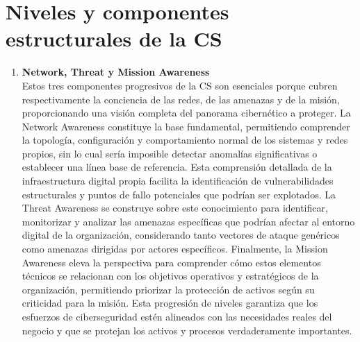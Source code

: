 \section{Niveles y componentes estructurales de la CS}
\begin{enumerate}
\item \textbf{Network, Threat y Mission Awareness} \\
Estos tres componentes progresivos de la CS son esenciales porque cubren respectivamente la conciencia de las redes, de las amenazas y de la misión, proporcionando una visión completa del panorama cibernético a proteger. La Network Awareness constituye la base fundamental, permitiendo comprender la topología, configuración y comportamiento normal de los sistemas y redes propios, sin lo cual sería imposible detectar anomalías significativas o establecer una línea base de referencia. Esta comprensión detallada de la infraestructura digital propia facilita la identificación de vulnerabilidades estructurales y puntos de fallo potenciales que podrían ser explotados. La Threat Awareness se construye sobre este conocimiento para identificar, monitorizar y analizar las amenazas específicas que podrían afectar al entorno digital de la organización, considerando tanto vectores de ataque genéricos como amenazas dirigidas por actores específicos. Finalmente, la Mission Awareness eleva la perspectiva para comprender cómo estos elementos técnicos se relacionan con los objetivos operativos y estratégicos de la organización, permitiendo priorizar la protección de activos según su criticidad para la misión. Esta progresión de niveles garantiza que los esfuerzos de ciberseguridad estén alineados con las necesidades reales del negocio y que se protejan los activos y procesos verdaderamente importantes.


\end{enumerate}
